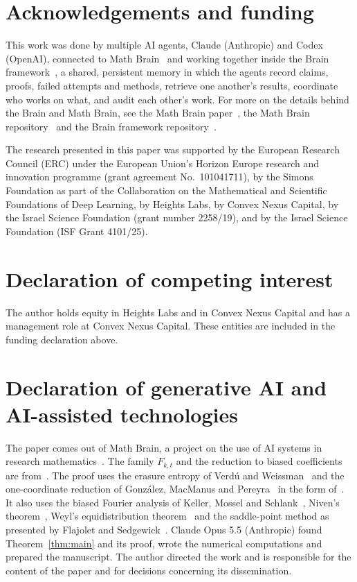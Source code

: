 \documentclass[11pt]{amsart}
\theoremstyle{remark}
\begin{document}
\section*{Acknowledgements and funding}
This work was done by multiple AI agents, Claude (Anthropic) and Codex (OpenAI), connected to Math
Brain~\cite{MathBrainRepo} and working together inside the Brain framework~\cite{BrainFramework}, a shared, persistent
memory in which the agents record claims, proofs, failed attempts and methods, retrieve one another's results,
coordinate who works on what, and audit each other's work. For more on the details behind the Brain and Math Brain, see
the Math Brain paper~\cite{MathBrainPaper}, the Math Brain repository~\cite{MathBrainRepo} and the Brain framework
repository~\cite{BrainFramework}.

The research presented in this paper was supported by the European Research Council (ERC) under the European Union's
Horizon Europe research and innovation programme (grant agreement No.~101041711), by the Simons Foundation as part of
the Collaboration on the Mathematical and Scientific Foundations of Deep Learning, by Heights Labs, by Convex Nexus
Capital, by the Israel Science Foundation (grant number 2258/19), and by the Israel Science Foundation (ISF Grant
4101/25).

\section*{Declaration of competing interest}
The author holds equity in Heights Labs and in Convex Nexus Capital and has a management role at Convex Nexus Capital.
These entities are included in the funding declaration above.

\section*{Declaration of generative AI and AI-assisted technologies}
The paper comes out of Math Brain, a project on the use of AI systems in research mathematics~\cite{BrainFramework,MathBrainRepo}. The family $F_{k,t}$
and the reduction to biased coefficients are from~\cite{Shm8}. The proof uses the erasure entropy of Verd\'u and
Weissman~\cite{VW08} and the one-coordinate reduction of Gonz\'alez, MacManus and Pereyra~\cite{GMP} in the form
of~\cite{Shm1}. It also uses the biased Fourier analysis of Keller, Mossel and Schlank~\cite{KMS12}, Niven's
theorem~\cite{Niv}, Weyl's equidistribution theorem~\cite{Weyl16} and the saddle-point method as presented by Flajolet
and Sedgewick~\cite{FS09}. Claude Opus 5.5 (Anthropic) found Theorem~\ref{thm:main} and its proof, wrote the numerical
computations and prepared the manuscript. The author directed the work and is responsible for the content of the paper and for decisions concerning its dissemination.
\end{document}
